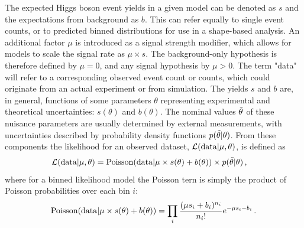 The expected Higgs boson event yields in a given model can be denoted as $s$ and the expectations from background as $b$. This can refer equally to single event counts, or to predicted binned distributions for use in a shape-based analysis. An additional factor $\mu$ is introduced as a signal strength modifier, which allows for models to scale the signal rate as $\mu \times s$. The background-only hypothesis is therefore defined by $\mu = 0$, and any signal hypothesis by $\mu > 0$. The term "data" will refer to a corresponding observed event count or counts, which could originate from an actual experiment or from simulation. The yields $s$ and $b$ are, in general, functions of some parameters $\theta$ representing experimental and theoretical uncertainties: $s(\theta)$ and $b(\theta)$. The nominal values $\Tilde{\theta}$ of these nuisance parameters are usually determined by external measurements, with uncertainties described by probability density functions $p(\Tilde{\theta} | \theta)$. From these components the likelihood for an observed dataset, $\mathcal{L}(\mathrm{data}|\mu,\theta)$, is defined as
\begin{equation}
    \Lagr(\mathrm{data}|\mu,\theta) = \mathrm{Poisson}(\mathrm{data}|\mu\times s(\theta) + b(\theta)) \times p(\Tilde{\theta}|\theta) \msep
\end{equation}
where for a binned likelihood model the Poisson tern is simply the product of Poisson probabilities over each bin $i$:
\begin{equation}
    \mathrm{Poisson}(\mathrm{data}|\mu\times s(\theta) + b(\theta)) = \prod_{i} \frac{(\mu s_i + b_i)^{n_i}}{n_i !} e^{-\mu s_i -b_i} \mend
\end{equation}

